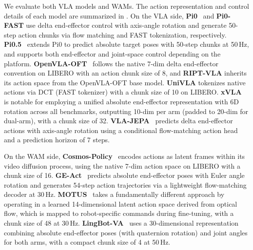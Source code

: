 \documentclass{article}
\begin{document}
We evaluate both VLA models and WAMs. The action representation and control details of each model are summarized in . On the VLA side, \textbf{Pi0}~\cite{black2025pi0} and \textbf{Pi0-FAST} use delta end-effector control with axis-angle rotation and generate 50-step action chunks via flow matching and FAST tokenization, respectively. \textbf{Pi0.5}~\citep{pi05} extends Pi0 to predict absolute target poses with 50-step chunks at 50\,Hz, and supports both end-effector and joint-space control depending on the platform. \textbf{OpenVLA-OFT}~\citep{openvla2025} follows the native 7-dim delta end-effector convention on LIBERO with an action chunk size of 8, and \textbf{RIPT-VLA} inherits its action space from the OpenVLA-OFT base model. \textbf{UniVLA} tokenizes native actions via DCT (FAST tokenizer) with a chunk size of 10 on LIBERO. \textbf{xVLA}~\citep{zheng2026xvla} is notable for employing a unified absolute end-effector representation with 6D rotation across all benchmarks, outputting 10-dim per arm (padded to 20-dim for dual-arm), with a chunk size of 32. \textbf{VLA-JEPA}~\citep{sun2026vla} predicts delta end-effector actions with axis-angle rotation using a conditional flow-matching action head and a prediction horizon of 7 steps.

On the WAM side, \textbf{Cosmos-Policy}~\citep{kim2026cosmos} encodes actions as latent frames within its video diffusion process, using the native 7-dim action space on LIBERO with a chunk size of 16. \textbf{GE-Act}~\citep{liao2025genie} predicts absolute end-effector poses with Euler angle rotation and generates 54-step action trajectories via a lightweight flow-matching decoder at 30\,Hz. \textbf{MOTUS}~\citep{bi2025motus} takes a fundamentally different approach by operating in a learned 14-dimensional latent action space derived from optical flow, which is mapped to robot-specific commands during fine-tuning, with a chunk size of 48 at 30\,Hz. \textbf{LingBot-VA}~\citep{li2026causal} uses a 30-dimensional representation combining absolute end-effector poses (with quaternion rotation) and joint angles for both arms, with a compact chunk size of 4 at 50\,Hz.
\end{document}
